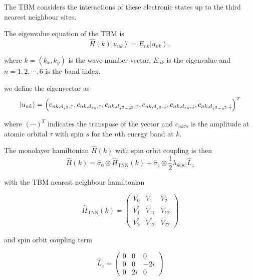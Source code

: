 \documentclass[10pt, twocolumn]{article} %
\begin{document}
  The TBM considers the interactions of these electronic states up to the third nearest neighbour sites.

  The eigenvalue equation of the TBM is 
      \begin{equation}
        \label{TBM_evalue_eqn}
        \hat{H}(k)\left|u_{n k}\right\rangle=E_{n k}\left|u_{n k}\right\rangle,
      \end{equation}

   where $k=\left(k_{x}, k_{y}\right)$ is the wave-number vector, $E_{nk}$ is the eigenvalue and $n = 1,2,\cdots,6$ is the band index.

   we define the eigenvector as
      \begin{equation}
        \left|u_{n k}\right\rangle=$ $\left(c_{n k, d_{z^{2}}, \uparrow}, c_{n k, d_{x y}, \uparrow}, c_{n k, d_{x^{2}-y^{2}}, \uparrow}, c_{n k, d_{z^{2}}, \downarrow}, c_{n k, d_{x y}, \downarrow}, c_{n k, d_{x^{2}-y^{2}}, \downarrow}\right)^{T}
      \end{equation}

  where $(\cdots)^T$ indicates the transpose of the vector and $c_{nk\tau s}$ is the amplitude at atomic orbital $\tau$ with spin $s$ for the $n$th energy band at $k$.

  The monolayer hamiltonian $\hat{H}(k)$ with spin orbit coupling is then 
      \begin{equation}
        \hat{H}(k)=\hat{\sigma}_{0} \otimes \hat{H}_{\mathrm{TNN}}(k)+\hat{\sigma}_{z} \otimes \frac{1}{2} \lambda_{\mathrm{SOC}} \hat{L}_{z}
      \end{equation}

  with the TBM nearest neighbour hamiltonian

      \begin{equation}
        \hat{H}_{\mathrm{TNN}}(k)=\left(\begin{array}{ccc}
        V_{0} & V_{1} & V_{2} \\
        V_{1}^{*} & V_{11} & V_{12} \\
        V_{2}^{*} & V_{12}^{*} & V_{22}
        \end{array}\right)
      \end{equation}

  and spin orbit coupling term

      \begin{equation}
        \hat{L}_{z}=\left(\begin{array}{ccc}
        0 & 0 & 0 \\
        0 & 0 & -2 i \\
        0 & 2 i & 0
        \end{array}\right)
      \end{equation}
\end{document}
